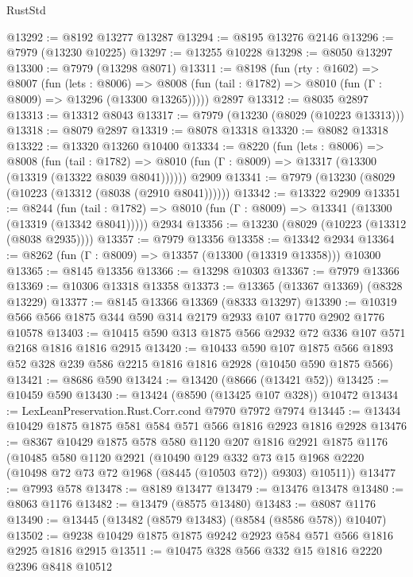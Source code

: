 \begin{lexlean}{RustStd}
\begin{coremodule}
@13292 := @8192 @13277 @13287
@13294 := @8195 @13276 @2146
@13296 := @7979 (@13230 @10225)
@13297 := @13255 @10228
@13298 := @8050 @13297
@13300 := @7979 (@13298 @8071)
@13311 := @8198
    (fun (rty : @1602) =>
    @8007
      (fun (lets : @8006) =>
      @8008 (fun (tail : @1782) => @8010 (fun (Γ : @8009) => @13296 (@13300 @13265)))))
    @2897
@13312 := @8035 @2897
@13313 := @13312 @8043
@13317 := @7979 (@13230 (@8029 (@10223 @13313)))
@13318 := @8079 @2897
@13319 := @8078 @13318
@13320 := @8082 @13318
@13322 := @13320 @13260 @10400
@13334 := @8220
    (fun (lets : @8006) =>
    @8008
      (fun (tail : @1782) =>
      @8010 (fun (Γ : @8009) => @13317 (@13300 (@13319 (@13322 @8039 @8041))))))
    @2909
@13341 := @7979 (@13230 (@8029 (@10223 (@13312 (@8038 (@2910 @8041))))))
@13342 := @13322 @2909
@13351 := @8244
    (fun (tail : @1782) => @8010 (fun (Γ : @8009) => @13341 (@13300 (@13319 (@13342 @8041)))))
    @2934
@13356 := @13230 (@8029 (@10223 (@13312 (@8038 @2935))))
@13357 := @7979 @13356
@13358 := @13342 @2934
@13364 := @8262 (fun (Γ : @8009) => @13357 (@13300 (@13319 @13358))) @10300
@13365 := @8145 @13356
@13366 := @13298 @10303
@13367 := @7979 @13366
@13369 := @10306 @13318 @13358
@13373 := @13365 (@13367 @13369) (@8328 @13229)
@13377 := @8145 @13366 @13369 (@8333 @13297)
@13390 := @10319 @566 @566 @1875 @344 @590 @314 @2179 @2933 @107 @1770 @2902 @1776 @10578
@13403 := @10415 @590 @313 @1875 @566 @2932 @72 @336 @107 @571 @2168 @1816 @1816 @2915
@13420 := @10433
    @590
    @107
    @1875
    @566
    @1893
    @52
    @328
    @239
    @586
    @2215
    @1816
    @1816
    @2928
    (@10450 @590 @1875 @566)
@13421 := @8686 @590
@13424 := @13420 (@8666 (@13421 @52))
@13425 := @10459 @590
@13430 := @13424 (@8590 (@13425 @107 @328)) @10472
@13434 := LexLeanPreservation.Rust.Corr.cond @7970 @7972 @7974
@13445 := @13434 @10429 @1875 @1875 @581 @584 @571 @566 @1816 @2923 @1816 @2928
@13476 := @8367
    @10429
    @1875
    @578
    @580
    @1120
    @207
    @1816
    @2921
    @1875
    @1176
    (@10485
      @580
      @1120
      @2921
      (@10490
        @129
        @332
        @73
        @15
        @1968
        @2220
        (@10498 @72 @73 @72 @1968 (@8445 (@10503 @72)) @9303)
        @10511))
@13477 := @7993 @578
@13478 := @8189 @13477
@13479 := @13476 @13478
@13480 := @8063 @1176
@13482 := @13479 (@8575 @13480)
@13483 := @8087 @1176
@13490 := @13445 (@13482 (@8579 @13483) (@8584 (@8586 @578)) @10407)
@13502 := @9238 @10429 @1875 @1875 @9242 @2923 @584 @571 @566 @1816 @2925 @1816 @2915
@13511 := @10475 @328 @566 @332 @15 @1816 @2220 @2396 @8418 @10512

\end{coremodule}
\end{lexlean}
